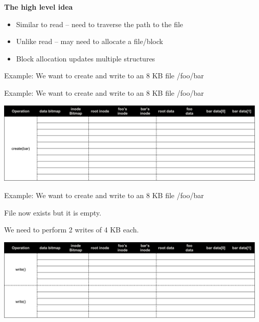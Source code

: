 \begin{slide}


    \textbf{The high level idea}
    \begin{itemize}
        \item Similar to read – need to traverse the path to the file
        \item Unlike read – may need to allocate a file/block
        \item Block allocation updates multiple structures
    \end{itemize}
    \bigskip

    Example: We want to create and write to an 8 KB file /foo/bar

\end{slide}

\begin{slide}


    Example: We want to create and write to an 8 KB file /foo/bar
    \bigskip

    \includegraphics[width=130mm]{write-file-1.png}

\end{slide}

\begin{slide}


    Example: We want to create and write to an 8 KB file /foo/bar
    \bigskip

    File now exists but it is empty.
    \bigskip

    We need to perform 2 writes of 4 KB each.
    \bigskip

    \includegraphics[width=130mm]{write-file-2.png}

\end{slide}

